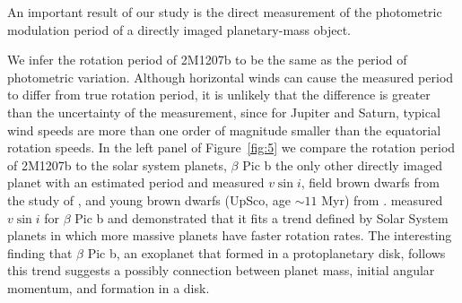 \documentclass[apj]{emulateapj}
\newcommand{\bpic}{$\beta$ Pic}
\newcommand{\vsini}{$v\sin i$}
\newcommand{\revise}[1]{\textbf{{\color{cyan}{#1}}}}
\renewcommand{\revise}{}
\begin{document}

An important result of our study is the direct measurement of the
photometric modulation period of a directly imaged planetary-mass
object.

We infer the rotation period of
2M1207b to be the same as the period of photometric
variation. Although horizontal winds can cause the measured period to
differ from true rotation period, it is unlikely that the difference
is greater than the uncertainty of the measurement, since for Jupiter
and Saturn, typical wind speeds are more than one order of magnitude
smaller than the equatorial rotation speeds.
In the left panel of Figure~\ref{fig:5} we compare the rotation period
of 2M1207b to the solar system planets, \bpic{} b the only other
directly imaged planet with an estimated period and measured \vsini,
field brown dwarfs from the study of \citet[][]{Metchev2015},
\revise{and young brown dwarfs (UpSco, age $\sim 11$ Myr) from
  \citet[][]{Scholz2015}}. \citet[][]{Snellen2014} measured \vsini{}
for \bpic{} b and demonstrated that it fits a trend defined by Solar
System planets in which more massive planets have faster rotation
rates. The interesting finding that \bpic{} b, an exoplanet that
formed in a protoplanetary disk, follows this trend suggests a
possibly connection between planet mass, initial angular momentum, and
formation in a disk.
\end{document}
